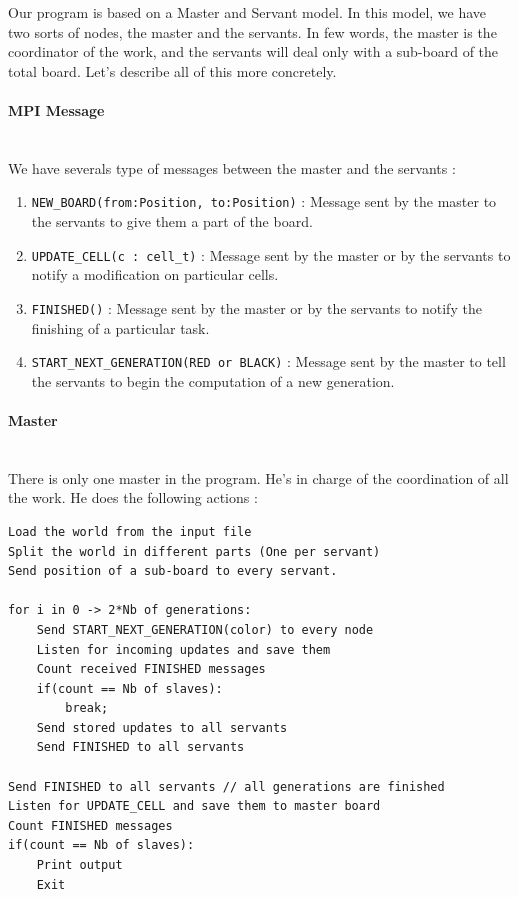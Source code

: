 \documentclass[a4paper,10pt]{article}
\begin{document}
Our program is based on a Master and Servant model.
In this model, we have two sorts of nodes, the master and the servants.
In few words, the master is the coordinator of the work, and the servants will deal only with a sub-board of the total board.
Let's describe all of this more concretely.

\paragraph{MPI Message}
~\\

We have severals type of messages between the master and the servants :

\begin{enumerate}
 \item \texttt{NEW\_BOARD(from:Position, to:Position)} : Message sent by the master to the servants to give them a part of the board.
 \item \texttt{UPDATE\_CELL(c : cell\_t)} : Message sent by the master or by the servants to notify a modification on particular cells.
 \item \texttt{FINISHED()} : Message sent by the master or by the servants to notify the finishing of a particular task.
 \item \texttt{START\_NEXT\_GENERATION(RED or BLACK)} : Message sent by the master to tell the servants to begin the computation
 of a new generation.
\end{enumerate}

\paragraph{Master}
~\\

There is only one master in the program. He's in charge of the coordination of all the work. He does the following actions :

\begin{lstlisting}
Load the world from the input file
Split the world in different parts (One per servant)
Send position of a sub-board to every servant.

for i in 0 -> 2*Nb of generations:
    Send START_NEXT_GENERATION(color) to every node
    Listen for incoming updates and save them
    Count received FINISHED messages
    if(count == Nb of slaves):
		break;
    Send stored updates to all servants
    Send FINISHED to all servants
    
Send FINISHED to all servants // all generations are finished
Listen for UPDATE_CELL and save them to master board
Count FINISHED messages
if(count == Nb of slaves):
    Print output
    Exit
\end{lstlisting}
\end{document}
